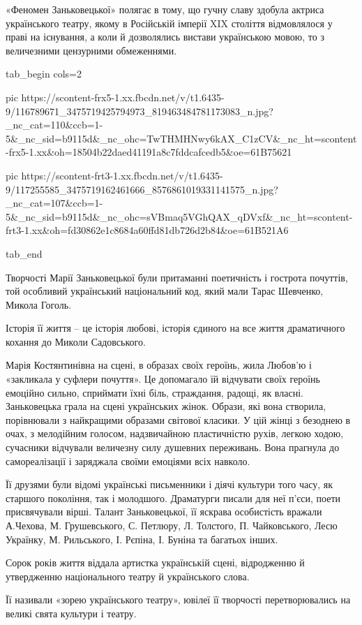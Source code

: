 «Феномен Заньковецької» полягає в тому, що гучну славу здобула актриса
українського театру, якому в Російській імперії XIX століття відмовлялося у
праві на існування, а коли й дозволялись вистави українською мовою, то з
величезними цензурними обмеженнями.

\ifcmt
  tab_begin cols=2

     pic https://scontent-frx5-1.xx.fbcdn.net/v/t1.6435-9/116789671_3475719425794973_819463484781173083_n.jpg?_nc_cat=110&ccb=1-5&_nc_sid=b9115d&_nc_ohc=TwTHMHNwy6kAX_C1zCV&_nc_ht=scontent-frx5-1.xx&oh=18504b22daed41191a8c7fddcafcedb5&oe=61B75621

     pic https://scontent-frt3-1.xx.fbcdn.net/v/t1.6435-9/117255585_3475719162461666_8576861019331141575_n.jpg?_nc_cat=107&ccb=1-5&_nc_sid=b9115d&_nc_ohc=sVBmaq5VGhQAX_qDVxf&_nc_ht=scontent-frt3-1.xx&oh=fd30862e1c8684a60ffd81db726d2b84&oe=61B521A6

  tab_end
\fi

Творчості Марії Заньковецької були притаманні поетичність і гострота почуттів,
той особливий український національний код, який мали Тарас Шевченко, Микола
Гоголь.

Історія її життя – це історія любові, історія єдиного на все життя драматичного
кохання до Миколи Садовського.

Марія Костянтинівна на сцені, в образах своїх героїнь, жила Любов’ю і
«закликала у суфлери почуття». Це допомагало їй відчувати своїх героїнь
емоційно сильно, сприймати їхні біль, страждання, радощі, як власні.
Заньковецька грала на сцені українських жінок. Образи, які вона створила,
порівнювали з найкращими образами світової класики. У цій жінці з безоднею в
очах, з мелодійним голосом, надзвичайною пластичністю рухів, легкою ходою,
сучасники відчували величезну силу душевних переживань. Вона прагнула до
самореалізації і заряджала своїми емоціями всіх навколо.

Її друзями були відомі українські письменники і діячі культури того часу, як
старшого покоління, так і молодшого. Драматурги писали для неї п’єси, поети
присвячували вірші. Талант Заньковецької, її яскрава особистість вражали
А.Чехова, М. Грушевського, С. Петлюру, Л. Толстого, П. Чайковського, Лесю
Українку, М. Рильського, І. Рєпіна, І. Буніна та багатьох інших.

Сорок років життя віддала артистка українській сцені, відродженню й утвердженню
національного театру й українського слова.

Її називали «зорею українського театру», ювілеї її творчості перетворювались на
великі свята культури і театру.

